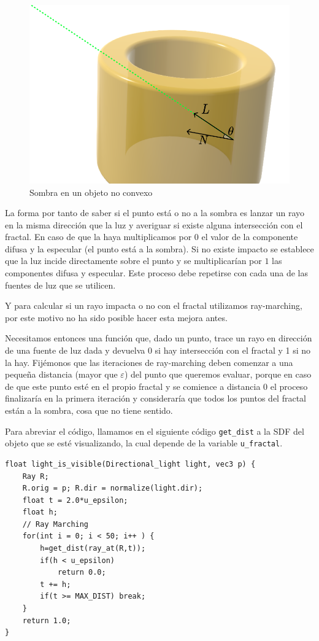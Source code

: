 \begin{figure} [ht]
    \centering
    \includegraphics[scale = 0.3]{img/C8/no-convexo.png}
    \caption{Sombra en un objeto no convexo}
    \label{fig:objeto-no-convexo}
\end{figure}

La forma por tanto de saber si el punto está o no a la sombra es lanzar un rayo en la misma dirección que la luz y averiguar si existe alguna intersección con el fractal. En caso de que la haya multiplicamos por $0$ el valor de la componente difusa y la especular (el punto está a la sombra). Si no existe impacto se establece que la luz incide directamente sobre el punto y se multiplicarían por $1$ las componentes difusa y especular. Este proceso debe repetirse con cada una de las fuentes de luz que se utilicen.

Y para calcular si un rayo impacta o no con el fractal utilizamos ray-marching, por este motivo no ha sido posible hacer esta mejora antes. 

Necesitamos entonces una función que, dado un punto, trace un rayo en dirección de una fuente de luz dada y devuelva 0 si hay intersección con el fractal y 1 si no la hay. Fijémonos que las iteraciones de ray-marching deben comenzar a una pequeña distancia (mayor que $\varepsilon$) del punto que queremos evaluar, porque en caso de que este punto esté en el propio fractal y se comience a distancia $0$ el proceso finalizaría en la primera iteración y consideraría que todos los puntos del fractal están a la sombra, cosa que no tiene sentido. 

Para abreviar el código, llamamos en el siguiente código \verb|get_dist| a la SDF del objeto que se esté visualizando, la cual depende de la variable \verb|u_fractal|.
\begin{lstlisting}
float light_is_visible(Directional_light light, vec3 p) {
    Ray R;
    R.orig = p; R.dir = normalize(light.dir);
    float t = 2.0*u_epsilon;
    float h;
    // Ray Marching 
    for(int i = 0; i < 50; i++ ) {
        h=get_dist(ray_at(R,t));
        if(h < u_epsilon)
            return 0.0;
        t += h;
        if(t >= MAX_DIST) break;
    }
    return 1.0;
}
\end{lstlisting}

